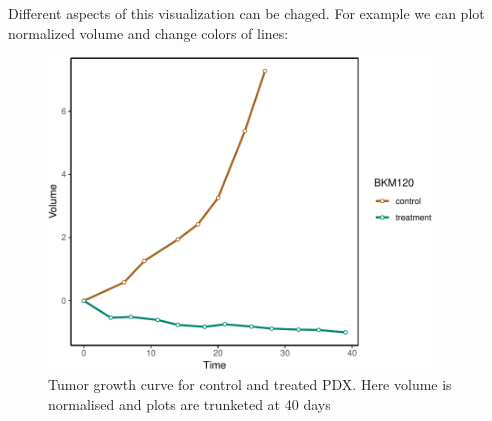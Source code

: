 \documentclass{article}\usepackage[]{graphicx}\usepackage[usenames,dvipsnames]{color}
\newcommand{\hlnum}[1]{\textcolor[rgb]{0.816,0.125,0.439}{#1}}%
\newcommand{\hlstr}[1]{\textcolor[rgb]{0.251,0.627,0.251}{#1}}%
\newcommand{\hlstd}[1]{\textcolor[rgb]{0.251,0.251,0.251}{#1}}%
\newcommand{\hlkwc}[1]{\textcolor[rgb]{0.251,0.251,0.251}{#1}}%
\newcommand{\hlkwd}[1]{\textcolor[rgb]{0.878,0.439,0.125}{#1}}%
\newenvironment{knitrout}{}{} %
\begin{document}
Different aspects of this visualization can be chaged. For example we can plot normalized volume and change colors of lines:
\begin{knitrout}
\color{fgcolor}\begin{figure}
\includegraphics[width=4in]{figure/pdxplot2-1} \caption{Tumor growth curve for control and treated PDX. Here volume is normalised and plots are trunketed at 40 days}\label{fig:pdxplot2}
\end{figure}

\end{knitrout}
\end{document}
